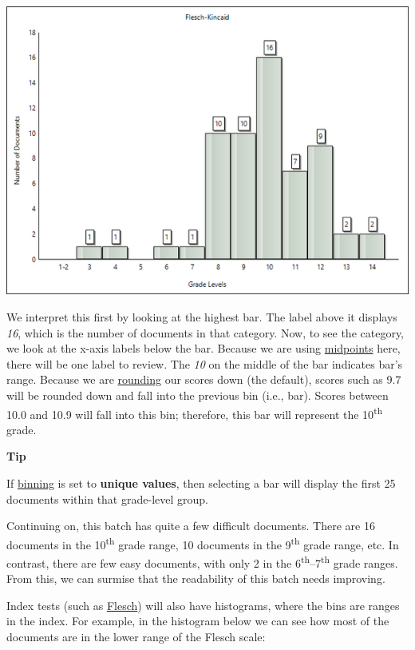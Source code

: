 \documentclass[
]{book}
\newenvironment{tipsection}
    {
    \begin{tcolorbox}[colframe=lightgray,colback=lightyellow,arc=3mm]
    \faLightbulb[regular] \textbf{Tip} \newline
    }
    {
    \end{tcolorbox}
    }
\theoremstyle{definition}
\theoremstyle{definition}
\theoremstyle{definition}
\theoremstyle{definition}
\theoremstyle{remark}
\begin{document}
\begin{center}\includegraphics[width=0.75\linewidth,]{Images/histogrades} \end{center}

We interpret this first by looking at the highest bar. The label above it displays \emph{16}, which is the number of documents in that category. Now, to see the category, we look at the x-axis labels below the bar. Because we are using \protect\hyperlink{options-histograms}{midpoints} here, there will be one label to review. The \emph{10} on the middle of the bar indicates bar's range. Because we are \protect\hyperlink{options-histograms}{rounding} our scores down (the default), scores such as 9.7 will be rounded down and fall into the previous bin (i.e., bar). Scores between 10.0 and 10.9 will fall into this bin; therefore, this bar will represent the 10\textsuperscript{th} grade.

\begin{tipsection}
If \protect\hyperlink{options-histograms}{binning} is set to \textbf{unique values}, then selecting a bar will display the first 25 documents within that grade-level group.

\end{tipsection}

Continuing on, this batch has quite a few difficult documents. There are 16 documents in the 10\textsuperscript{th} grade range, 10 documents in the 9\textsuperscript{th} grade range, etc. In contrast, there are few easy documents, with only 2 in the 6\textsuperscript{th}--7\textsuperscript{th} grade ranges. From this, we can surmise that the readability of this batch needs improving.

Index tests (such as \protect\hyperlink{flesch-test}{Flesch}) will also have histograms, where the bins are ranges in the index. For example, in the histogram below we can see how most of the documents are in the lower range of the Flesch scale:
\end{document}
